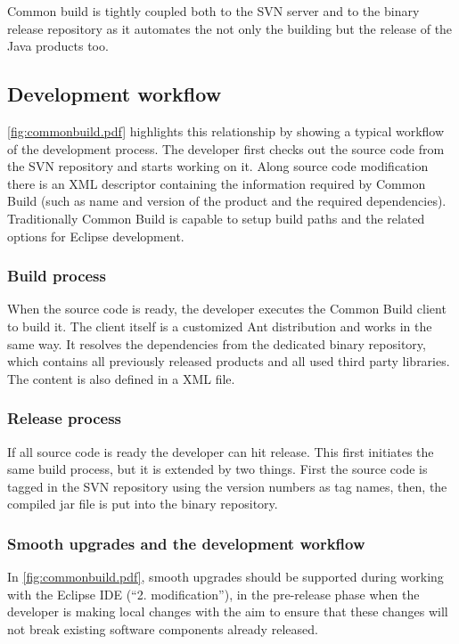 Common build is tightly coupled both to the SVN server and to the binary release
repository as it automates the not only the building but the release of the
Java products too.

\subsection{Development workflow}
\autoref{fig:commonbuild.pdf} highlights this relationship by showing a typical
workflow of the development process. The developer first checks out the source
code from the SVN repository and starts working on it. Along source code
modification there is an XML descriptor containing the information required by
Common Build (such as name and version of the product and the required
dependencies). Traditionally Common Build is capable to setup build paths and the related
options for Eclipse development. 

\subsubsection{Build process}
When the source code is ready, the developer executes the Common Build client to
build it. The client itself is a customized Ant distribution and works in the
same way. It resolves the dependencies from the dedicated binary repository,
which contains all previously released products and all used third party
libraries. The content is also defined in a XML file.

\subsubsection{Release process}
If all source code is ready the developer can hit release. This first initiates
the same build process, but it is extended by two things. First the source code
is tagged in the SVN repository using the version numbers as tag names, then, the
compiled jar file is put into the binary repository. 

\subsubsection{Smooth upgrades and the development workflow}
In \autoref{fig:commonbuild.pdf}, smooth upgrades should be supported during working
with the Eclipse IDE (``2. modification''), in the pre-release phase when the
developer is making local changes with the aim to ensure that these changes will
not break existing software components already released.


